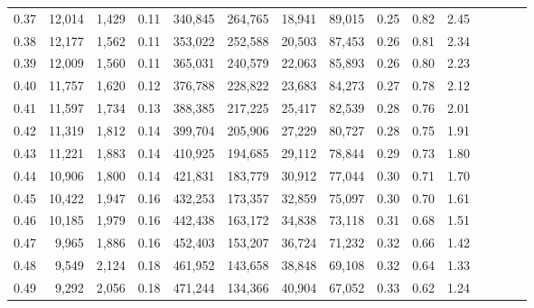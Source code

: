 \begin{tabular}{rrrcrrrrrrrrrrr}
0.37 &  12,014 &  1,429 &                                       0.11 &  340,845 &  264,765 &   18,941 &   89,015 &  0.25 &  0.82 &                         2.45 \\
0.38 &  12,177 &  1,562 &                                       0.11 &  353,022 &  252,588 &   20,503 &   87,453 &  0.26 &  0.81 &                         2.34 \\
0.39 &  12,009 &  1,560 &                                       0.11 &  365,031 &  240,579 &   22,063 &   85,893 &  0.26 &  0.80 &                         2.23 \\
0.40 &  11,757 &  1,620 &                                       0.12 &  376,788 &  228,822 &   23,683 &   84,273 &  0.27 &  0.78 &                         2.12 \\
0.41 &  11,597 &  1,734 &                                       0.13 &  388,385 &  217,225 &   25,417 &   82,539 &  0.28 &  0.76 &                         2.01 \\
0.42 &  11,319 &  1,812 &                                       0.14 &  399,704 &  205,906 &   27,229 &   80,727 &  0.28 &  0.75 &                         1.91 \\
0.43 &  11,221 &  1,883 &                                       0.14 &  410,925 &  194,685 &   29,112 &   78,844 &  0.29 &  0.73 &                         1.80 \\
0.44 &  10,906 &  1,800 &                                       0.14 &  421,831 &  183,779 &   30,912 &   77,044 &  0.30 &  0.71 &                         1.70 \\
0.45 &  10,422 &  1,947 &                                       0.16 &  432,253 &  173,357 &   32,859 &   75,097 &  0.30 &  0.70 &                         1.61 \\
0.46 &  10,185 &  1,979 &                                       0.16 &  442,438 &  163,172 &   34,838 &   73,118 &  0.31 &  0.68 &                         1.51 \\
0.47 &   9,965 &  1,886 &                                       0.16 &  452,403 &  153,207 &   36,724 &   71,232 &  0.32 &  0.66 &                         1.42 \\
0.48 &   9,549 &  2,124 &                                       0.18 &  461,952 &  143,658 &   38,848 &   69,108 &  0.32 &  0.64 &                         1.33 \\
0.49 &   9,292 &  2,056 &                                       0.18 &  471,244 &  134,366 &   40,904 &   67,052 &  0.33 &  0.62 &                         1.24 \\

\end{tabular}
